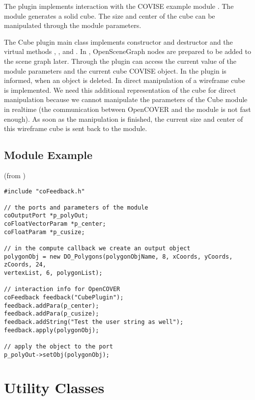 The plugin  implements interaction with the COVISE example 
module . The  module generates a solid cube. The
size and center of the cube can be manipulated through the module parameters.

The Cube plugin main class  implements constructor and destructor
and the virtual methods , ,  and
.
In , OpenSceneGraph nodes are prepared to be added to the scene graph later. 
Through  the plugin can access the current value of the
module parameters and the current cube COVISE object. In 
the plugin is informed, when an object is deleted. In 
direct manipulation of a wireframe cube is implemented. We need this
additional representation of the cube for direct manipulation because we 
cannot manipulate the
parameters of the Cube module in realtime (the communication between
OpenCOVER and the module is not fast enough). As soon as
the manipulation is finished, the current size and center of this wireframe
cube is sent back to the module.
 
\subsection{Module Example} 

(from )

\begin{verbatim}
#include "coFeedback.h"

// the ports and parameters of the module
coOutputPort *p_polyOut;
coFloatVectorParam *p_center;
coFloatParam *p_cusize;
 
// in the compute callback we create an output object
polygonObj = new DO_Polygons(polygonObjName, 8, xCoords, yCoords, zCoords, 24, 
vertexList, 6, polygonList);
 
// interaction info for OpenCOVER
coFeedback feedback("CubePlugin");
feedback.addPara(p_center);
feedback.addPara(p_cusize);
feedback.addString("Test the user string as well");
feedback.apply(polygonObj);
 
// apply the object to the port
p_polyOut->setObj(polygonObj);
\end{verbatim}





\section{Utility Classes}

